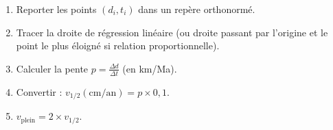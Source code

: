 \documentclass[11pt]{article}
\begin{document}
\begin{methode}
\begin{enumerate}
    \item Reporter les points $(d_i, t_i)$ dans un repère orthonormé.
    \item Tracer la droite de régression linéaire (ou droite passant par l'origine et le point le plus éloigné si relation proportionnelle).
    \item Calculer la pente $p = \frac{\Delta d}{\Delta t}$ (en km/Ma).
    \item Convertir : $v_{1/2} (\text{cm/an}) = p \times 0,1$.
    \item $v_{\text{plein}} = 2 \times v_{1/2}$.
\end{enumerate}
\end{methode}
\end{document}
